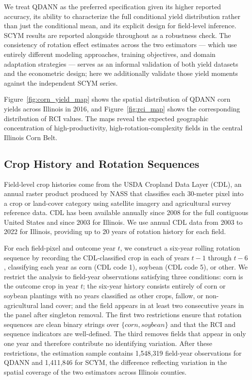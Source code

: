\documentclass[12pt,letterpaper]{article}
\theoremstyle{remark}
\theoremstyle{plain}
\theoremstyle{definition}
\begin{document}
We treat QDANN as the preferred specification given its higher reported accuracy, its ability to characterize the full conditional yield distribution rather than just the conditional mean, and its explicit design for field-level inference. SCYM results are reported alongside throughout as a robustness check. The consistency of rotation effect estimates across the two estimators — which use entirely different modeling approaches, training objectives, and domain adaptation strategies — serves as an informal validation of both yield datasets and the econometric design; here we additionally validate those yield moments against the independent SCYM series.

Figure~\ref{fig:corn_yield_map} shows the spatial distribution of QDANN corn yields across Illinois in 2016, and  Figure~\ref{fig:rci_map} shows the corresponding distribution of RCI values. The maps reveal the expected geographic concentration of high-productivity, high-rotation-complexity fields in the central Illinois Corn Belt.

\subsection{\label{subsec:rot_seq}Crop History and Rotation Sequences}
Field-level crop histories come from the USDA Cropland Data Layer (CDL), an annual raster product produced by NASS that classifies each 30-meter pixel into a crop or land-cover category using satellite imagery and agricultural survey reference data. CDL has been available annually since 2008 for the full contiguous United States and since 2003 for Illinois. We use annual CDL data from 2003 to 2022 for Illinois, providing up to 20 years of rotation history for each field.

For each field-pixel and outcome year $t$, we construct a six-year rolling rotation sequence by recording the CDL-classified crop in each of years $t-1$ through $t-6$, classifying each year as corn (CDL code 1), soybean (CDL code 5), or other. We restrict the analysis to field-year observations satisfying three conditions: corn is the outcome crop in year $t$; the six-year history consists entirely of corn or soybean plantings with no years classified as other crops, fallow, or non-agricultural land cover; and the field appears in at least two consecutive years in the panel after singleton removal. The first two restrictions ensure that rotation sequences are clean binary strings over $\{corn, soybean\}$ and that the RCI and sequence indicators are well-defined. The third removes fields that appear in only one year and therefore contribute no identifying variation. After these restrictions, the estimation sample contains 1,548,319 field-year observations for QDANN and 1,411,846 for SCYM, the difference reflecting variation in the spatial coverage of the two estimators across Illinois counties.
\end{document}
